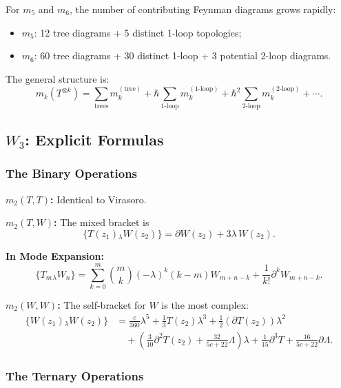 For $m_5$ and $m_6$, the number of contributing Feynman diagrams grows rapidly:
\begin{itemize}
\item $m_5$: 12 tree diagrams + 5 distinct 1-loop topologies;
\item $m_6$: 60 tree diagrams + 30 distinct 1-loop + 3 potential 2-loop diagrams.
\end{itemize}

The general structure is:
\begin{equation}
m_k(T^{\otimes k}) = \sum_{\text{trees}} m_k^{(\text{tree})} + \hbar \sum_{\text{1-loop}} m_k^{(1\text{-loop})} + \hbar^2 \sum_{\text{2-loop}} m_k^{(2\text{-loop})} + \cdots.
\end{equation}

\subsection{$W_3$: Explicit Formulas}

\subsubsection{The Binary Operations}

\textbf{$m_2(T,T)$:} Identical to Virasoro.

\textbf{$m_2(T,W)$:} The mixed bracket is
\begin{equation}
\{T(z_1) {}_\lambda W(z_2)\} = \partial W(z_2) + 3\lambda\,W(z_2).
\end{equation}

\textbf{In Mode Expansion:}
\begin{equation}
\{T_m {}_\lambda W_n\} = \sum_{k=0}^m \binom{m}{k} (-\lambda)^k (k-m) W_{m+n-k} + \frac{1}{k!} \partial^k W_{m+n-k}.
\end{equation}

\textbf{$m_2(W,W)$:} The self-bracket for $W$ is the most complex:
\begin{align}
\{W(z_1) {}_\lambda W(z_2)\} &= \frac{c}{360}\lambda^5 + \frac{1}{3}T(z_2)\lambda^3 + \frac{1}{2}(\partial T(z_2))\lambda^2\\
&\quad + \left(\frac{3}{10}\partial^2 T(z_2) + \frac{32}{5c+22}\Lambda\right)\lambda + \frac{1}{15}\partial^3 T + \frac{16}{5c+22}\partial\Lambda.
\end{align}

\subsubsection{The Ternary Operations}


